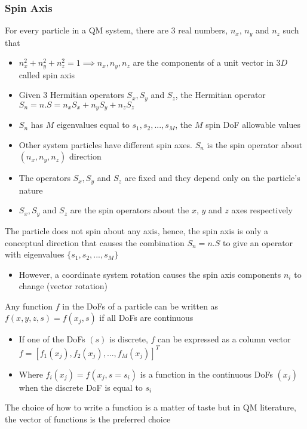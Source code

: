 \documentclass[8pt,t,mathserif,aspectratio=169]{beamer}
\begin{document}
\begin{frame}
  \frametitle{Spin Axis}
  \vspace{1mm}
  For every particle in a QM system, there are $3$ real numbers, $n_x$, $n_y$ and $n_z$ such that
  \begin{itemize}
    \item $n_x^2 + n_y^2 + n_z^2 = 1 \implies n_x, n_y, n_z$ are the components of a unit vector in $3D$ called spin axis
    \item Given $3$ Hermitian operators $S_x,S_y$ and $S_z$, the Hermitian operator $S_n = n.S = n_x S_x + n_y S_y + n_z S_z$
    \item $S_n$ has $M$ eigenvalues equal to $s_1,s_2,...,s_M$, the $M$ spin DoF allowable values 
    \item Other system particles have different spin axes. $S_n$ is the spin operator about $(n_x,n_y,n_z)$ direction
    \item The operators $S_x,S_y$ and $S_z$ are fixed and they depend only on the particle's nature
    \item $S_x,S_y$ and $S_z$ are the spin operators about the $x$, $y$ and $z$ axes respectively
  \end{itemize}
  The particle does not spin about any axis, hence, the spin axis is only a conceptual direction that causes the combination $S_n = n.S$ to give an operator with eigenvalues $\{s_1,s_2,...,s_M\}$
  \begin{itemize}
    \item However, a coordinate system rotation causes the spin axis components $n_i$ to change (vector rotation)
  \end{itemize}
  Any function $f$ in the DoFs of a particle can be written as $f(x,y,z,s) = f(x_j,s)$ if all DoFs are continuous
  \begin{itemize}
    \item If one of the DoFs $(s)$ is discrete, $f$ can be expressed as a column vector $f = [f_1(x_j),f_2(x_j),...,f_M(x_j)]^T$
    \item Where $f_i(x_j) = f(x_j,s = s_i)$ is a function in the continuous DoFs $(x_j)$ when the discrete DoF is equal to $s_i$
  \end{itemize}
  The choice of how to write a function is a matter of taste but in QM literature, the vector of functions is the preferred choice
\end{frame}
\end{document}
